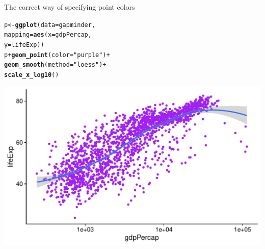 \documentclass[10pt]{beamer}\usepackage[]{graphicx}\usepackage[]{color}
\makeatletter
\def\maxwidth{ %
  \ifdim\Gin@nat@width>\linewidth
    \linewidth
  \else
    \Gin@nat@width
  \fi
}
\newcommand{\hlstr}[1]{\textcolor[rgb]{0.192,0.494,0.8}{#1}}%
\newcommand{\hlopt}[1]{\textcolor[rgb]{0,0,0}{#1}}%
\newcommand{\hlstd}[1]{\textcolor[rgb]{0.345,0.345,0.345}{#1}}%
\newcommand{\hlkwb}[1]{\textcolor[rgb]{0.69,0.353,0.396}{#1}}%
\newcommand{\hlkwc}[1]{\textcolor[rgb]{0.333,0.667,0.333}{#1}}%
\newcommand{\hlkwd}[1]{\textcolor[rgb]{0.737,0.353,0.396}{\textbf{#1}}}%
\newenvironment{kframe}{%
 \def\at@end@of@kframe{}%
 \ifinner\ifhmode%
  \def\at@end@of@kframe{\end{minipage}}%
  \begin{minipage}{\columnwidth}%
 \fi\fi%
 \def\FrameCommand##1{\hskip\@totalleftmargin \hskip-\fboxsep
 \colorbox{shadecolor}{##1}\hskip-\fboxsep
     \hskip-\linewidth \hskip-\@totalleftmargin \hskip\columnwidth}%
 \MakeFramed {\advance\hsize-\width
   \@totalleftmargin\z@ \linewidth\hsize
   \@setminipage}}%
 {\par\unskip\endMakeFramed%
 \at@end@of@kframe}
\newenvironment{knitrout}{}{} %
\makeatother
\begin{document}
\begin{frame}[fragile]{The correct way of specifying point colors}
\begin{knitrout}\tiny
{}\color{fgcolor}\begin{kframe}
\begin{alltt}
\hlstd{p} \hlkwb{<-} \hlkwd{ggplot}\hlstd{(}\hlkwc{data} \hlstd{= gapminder,}
                        \hlkwc{mapping} \hlstd{=} \hlkwd{aes}\hlstd{(}\hlkwc{x} \hlstd{= gdpPercap,}
                                        \hlkwc{y} \hlstd{= lifeExp))}
\hlstd{p} \hlopt{+} \hlkwd{geom_point}\hlstd{(}\hlkwc{color} \hlstd{=} \hlstr{"purple"}\hlstd{)} \hlopt{+}
        \hlkwd{geom_smooth}\hlstd{(}\hlkwc{method} \hlstd{=} \hlstr{"loess"}\hlstd{)} \hlopt{+}
        \hlkwd{scale_x_log10}\hlstd{()}
\end{alltt}
\end{kframe}

{\centering \includegraphics[width=\maxwidth]{figure/unnamed-chunk-13-1} 

}


\end{knitrout}
\end{frame}
\end{document}

